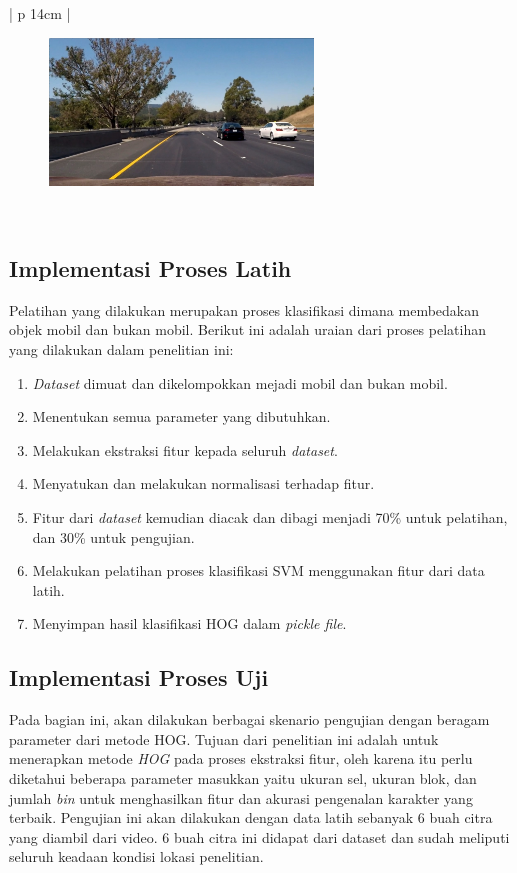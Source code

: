\begin{table}[H]
\begin{adjustbox}{width=1\textwidth}
\begin{tabular}{| p {14cm} |}
\begin{figure}[H]
				{\includegraphics[width = 7cm]{images/test6}}\\
			\end{figure} \\
			\hline
		\end{tabular}
	\end{adjustbox}
	\label{fig:ContohDataDeteksi}
\end{table}

\subsection{Implementasi Proses Latih}
Pelatihan yang dilakukan merupakan proses klasifikasi dimana membedakan objek mobil dan bukan mobil. Berikut ini adalah uraian dari proses pelatihan yang dilakukan dalam penelitian ini:
\begin{enumerate}
	\item \textit{Dataset} dimuat dan dikelompokkan mejadi mobil dan bukan mobil.
	\item Menentukan semua parameter yang dibutuhkan.
	\item Melakukan ekstraksi fitur kepada seluruh \textit{dataset}.
	\item Menyatukan dan melakukan normalisasi terhadap fitur.
	\item Fitur dari \textit{dataset} kemudian diacak dan dibagi menjadi 70\% untuk pelatihan, dan 30\% untuk pengujian.
	\item Melakukan pelatihan proses klasifikasi SVM menggunakan fitur dari data latih.
	\item Menyimpan hasil klasifikasi HOG dalam \textit{pickle file}.
	\\
\end{enumerate}

\subsection{Implementasi Proses Uji}
Pada bagian ini, akan dilakukan berbagai skenario pengujian dengan beragam parameter dari metode HOG. Tujuan dari penelitian ini adalah untuk menerapkan metode \textit{HOG} pada proses ekstraksi fitur, oleh karena itu perlu diketahui beberapa parameter masukkan yaitu ukuran sel, ukuran blok, dan jumlah \textit{bin} untuk menghasilkan fitur dan akurasi pengenalan karakter yang terbaik. Pengujian ini akan dilakukan dengan data latih sebanyak 6 buah citra yang diambil dari video. 6 buah citra ini didapat dari dataset dan sudah meliputi seluruh keadaan kondisi lokasi penelitian.\\

